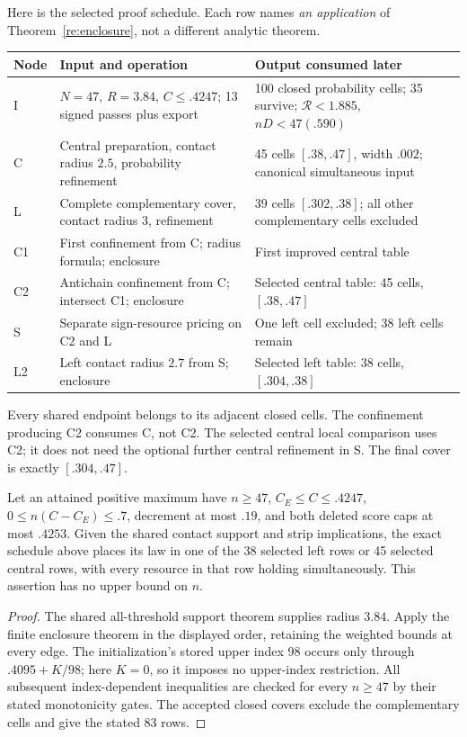 Here is the selected proof schedule. Each row names \emph{an application}
of Theorem~\ref{re:enclosure}, not a different analytic theorem.
\begin{center}\small
\begin{tabular}{p{.13\linewidth}p{.32\linewidth}p{.45\linewidth}}
\toprule
Node&Input and operation&Output consumed later\\\midrule
I&$N=47$, $R=3.84$, $C\le.4247$; 13 signed passes plus export&
100 closed probability cells; 35 survive; $\mathcal R<1.885$, $nD<47(.590)$\\
C&Central preparation, contact radius $2.5$, probability refinement&
45 cells $[.38,.47]$, width $.002$; canonical simultaneous input\\
L&Complete complementary cover, contact radius $3$, refinement&
39 cells $[.302,.38]$; all other complementary cells excluded\\
C1&First confinement from C; radius formula; enclosure&
First improved central table\\
C2&Antichain confinement from C; intersect C1; enclosure&
Selected central table: 45 cells, $[.38,.47]$\\
S&Separate sign-resource pricing on C2 and L&
One left cell excluded; 38 left cells remain\\
L2&Left contact radius $2.7$ from S; enclosure&
Selected left table: 38 cells, $[.304,.38]$\\\bottomrule
\end{tabular}
\end{center}
Every shared endpoint belongs to its adjacent closed cells. The
confinement producing C2 consumes C, not C2. The selected central local
comparison uses C2; it does not need the optional further central
refinement in S. The final cover is exactly $[.304,.47]$.

\begin{corollary}\label{re:acquired}
Let an attained positive maximum have $n\ge47$, $C_E\le C\le.4247$,
$0\le n(C-C_E)\le.7$, decrement at most $.19$, and both deleted
score caps at most $.4253$.
Given the shared contact support and strip implications, the exact
schedule above places its law in one of the 38 selected left rows or
45 selected central rows, with every resource in that row holding
simultaneously. This assertion has no upper bound on $n$.
\end{corollary}
\begin{proof}
The shared all-threshold support theorem supplies radius $3.84$.
Apply the finite enclosure theorem in the displayed order, retaining
the weighted bounds at every edge. The initialization's stored upper
index 98 occurs only through $.4095+K/98$; here $K=0$, so it imposes
no upper-index restriction. All subsequent index-dependent inequalities
are checked for every $n\ge47$ by their stated monotonicity gates.
The accepted closed covers exclude the complementary cells and give
the stated 83 rows.
\end{proof}

